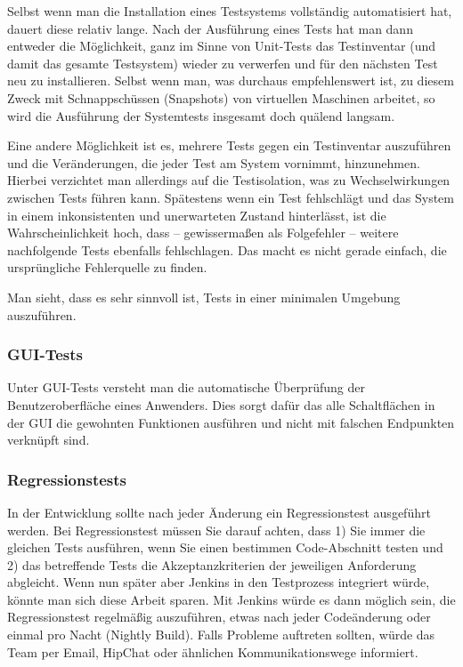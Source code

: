 Selbst wenn man die Installation eines Testsystems vollständig automatisiert hat, dauert
diese relativ lange. Nach der Ausführung eines Tests hat man dann entweder die Möglichkeit,
ganz im Sinne von Unit-Tests das Testinventar (und damit das gesamte Testsystem)
wieder zu verwerfen und für den nächsten Test neu zu installieren. Selbst wenn man, was
durchaus empfehlenswert ist, zu diesem Zweck mit Schnappschüssen (Snapshots) von virtuellen 
Maschinen arbeitet, so wird die Ausführung der Systemtests insgesamt doch quälend langsam.

Eine andere Möglichkeit ist es, mehrere Tests gegen ein Testinventar auszuführen und
die Veränderungen, die jeder Test am System vornimmt, hinzunehmen. Hierbei verzichtet
man allerdings auf die Testisolation, was zu Wechselwirkungen zwischen Tests führen
kann. Spätestens wenn ein Test fehlschlägt und das System in einem inkonsistenten und
unerwarteten Zustand hinterlässt, ist die Wahrscheinlichkeit hoch, dass – gewissermaßen
als Folgefehler – weitere nachfolgende Tests ebenfalls fehlschlagen. Das macht es nicht
gerade einfach, die ursprüngliche Fehlerquelle zu finden.

Man sieht, dass es sehr sinnvoll ist, Tests in einer minimalen Umgebung auszuführen.

\subsubsection{GUI-Tests}
Unter GUI-Tests versteht man die automatische Überprüfung der Benutzeroberfläche eines Anwenders.
Dies sorgt dafür das alle Schaltflächen in der GUI die gewohnten Funktionen ausführen und nicht mit falschen Endpunkten verknüpft sind.

\subsubsection{Regressionstests}
In der Entwicklung sollte nach jeder Änderung ein Regressionstest ausgeführt werden. Bei Regressionstest
müssen Sie darauf achten, dass 1) Sie immer die gleichen Tests ausführen, wenn Sie einen
bestimmen Code-Abschnitt testen und 2) das betreffende Tests die Akzeptanzkriterien der jeweiligen
Anforderung abgleicht. Wenn nun später aber Jenkins in den Testprozess integriert würde, könnte
man sich diese Arbeit sparen. Mit Jenkins würde es dann möglich sein, die Regressionstest regelmäßig
auszuführen, etwas nach jeder Codeänderung oder einmal pro Nacht (Nightly Build). Falls Probleme auftreten sollten,
würde das Team per Email, HipChat oder ähnlichen Kommunikationswege informiert.

